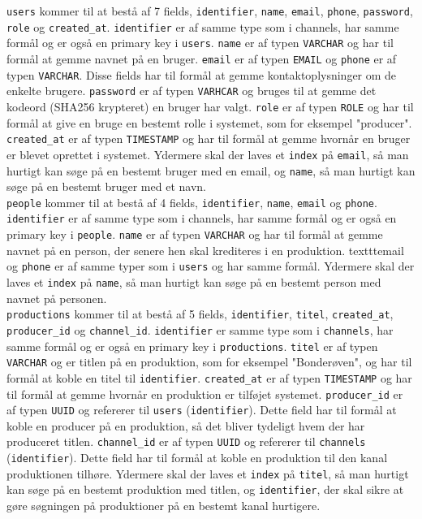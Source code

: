 \texttt{users} kommer til at bestå af 7 fields, \texttt{identifier}, \texttt{name}, \texttt{email}, \texttt{phone}, \texttt{password}, \texttt{role} og \texttt{created\_at}. \texttt{identifier} er af samme type som i channels, har samme formål og er også en primary key i \texttt{users}. \texttt{name} er af typen \texttt{VARCHAR} og har til formål at gemme navnet på en bruger. \texttt{email} er af typen \texttt{EMAIL} og \texttt{phone} er af typen \texttt{VARCHAR}. Disse fields har til formål at gemme kontaktoplysninger om de enkelte brugere. \texttt{password} er af typen \texttt{VARHCAR} og bruges til at gemme det kodeord (SHA256 krypteret) en bruger har valgt. \texttt{role} er af typen \texttt{ROLE} og har til formål at give en bruge en bestemt rolle i systemet, som for eksempel "producer". \texttt{created\_at} er af typen \texttt{TIMESTAMP} og har til formål at gemme hvornår en bruger er blevet oprettet i systemet. Ydermere skal der laves et \texttt{index} på \texttt{email}, så man hurtigt kan søge på en bestemt bruger med en email, og \texttt{name}, så man hurtigt kan søge på en bestemt bruger med et navn.\\


\texttt{people} kommer til at bestå af 4 fields, \texttt{identifier}, \texttt{name}, \texttt{email} og \texttt{phone}. \texttt{identifier} er af samme type som i channels, har samme formål og er også en primary key i \texttt{people}. \texttt{name} er af typen \texttt{VARCHAR} og har til formål at gemme navnet på en person, der senere hen skal krediteres i en produktion. texttt{email} og \texttt{phone} er af samme typer som i \texttt{users} og har samme formål. Ydermere skal der laves et \texttt{index} på \texttt{name}, så man hurtigt kan søge på en bestemt person med navnet på personen.\\


\texttt{productions} kommer til at bestå af 5 fields, \texttt{identifier}, \texttt{titel}, \texttt{created\_at}, \texttt{producer\_id} og \texttt{channel\_id}.  \texttt{identifier} er samme type som i \texttt{channels}, har samme formål og er også en primary key i \texttt{productions}. \texttt{titel} er af typen \texttt{VARCHAR} og er titlen på en produktion, som for eksempel "Bonderøven", og har til formål at koble en titel til \texttt{identifier}. \texttt{created\_at} er af typen \texttt{TIMESTAMP} og har til formål at gemme hvornår en produktion er tilføjet systemet. \texttt{producer\_id} er af typen \texttt{UUID} og refererer til \texttt{users} (\texttt{identifier}). Dette field har til formål at koble en producer på en produktion, så det bliver tydeligt hvem der har produceret titlen. \texttt{channel\_id} er af typen \texttt{UUID} og refererer til \texttt{channels} (\texttt{identifier}). Dette field har til formål at koble en produktion til den kanal produktionen tilhøre. Ydermere skal der laves et \texttt{index} på \texttt{titel}, så man hurtigt kan søge på en bestemt produktion med titlen, og \texttt{identifier}, der skal sikre at gøre søgningen på produktioner på en bestemt kanal hurtigere.\\


